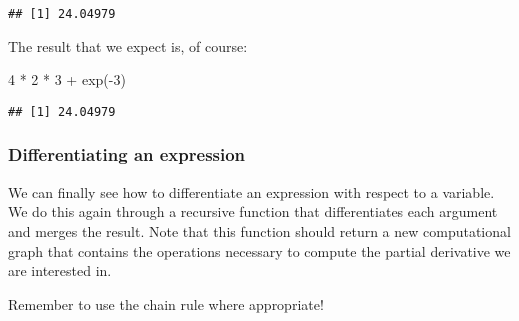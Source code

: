 \documentclass[
  a4paper,
]{article}
\newenvironment{Shaded}{\begin{snugshade}}{\end{snugshade}}
\newcommand{\DecValTok}[1]{\textcolor[rgb]{0.00,0.00,0.81}{#1}}
\newcommand{\FunctionTok}[1]{\textcolor[rgb]{0.00,0.00,0.00}{#1}}
\newcommand{\NormalTok}[1]{#1}
\newcommand{\SpecialCharTok}[1]{\textcolor[rgb]{0.00,0.00,0.00}{#1}}
\begin{document}
\begin{verbatim}
## [1] 24.04979
\end{verbatim}

The result that we expect is, of course:

\begin{Shaded}
\begin{Highlighting}[]
\DecValTok{4} \SpecialCharTok{*} \DecValTok{2} \SpecialCharTok{*} \DecValTok{3} \SpecialCharTok{+} \FunctionTok{exp}\NormalTok{(}\SpecialCharTok{{-}}\DecValTok{3}\NormalTok{)}
\end{Highlighting}
\end{Shaded}

\begin{verbatim}
## [1] 24.04979
\end{verbatim}

\hypertarget{differentiating-an-expression}{%
\subsubsection{Differentiating an
expression}\label{differentiating-an-expression}}

We can finally see how to differentiate an expression with respect to a
variable. We do this again through a recursive function that
differentiates each argument and merges the result. Note that this
function should return a new computational graph that contains the
operations necessary to compute the partial derivative we are interested
in.

Remember to use the chain rule where appropriate!
\end{document}
